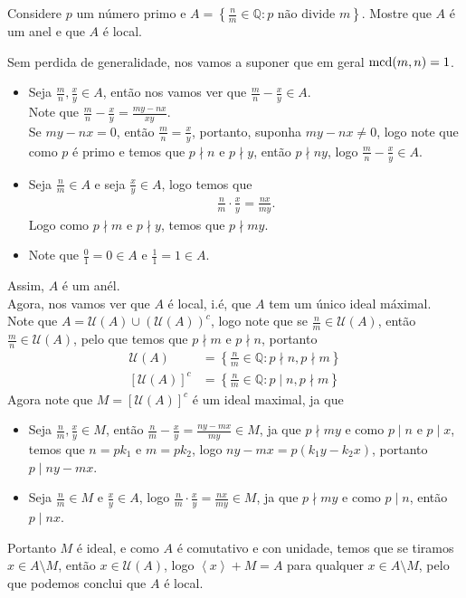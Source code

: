 \begin{homeworkProblem}[2]
  Considere $p$ um número primo e $A=\left\{\frac{n}{m}\in\mathbb{Q}:p\text{ não divide }m\right\}$. Mostre que $A$ é um anel e que $A$ é local. 
  \begin{solution}
    Sem perdida de generalidade, nos vamos a suponer que em geral $\operatorname{mcd}(m,n)=1$.
    \begin{itemize}
      \item Seja $\frac{m}{n},\frac{x}{y}\in A$, então nos vamos ver que $\frac{m}{n}-\frac{x}{y}\in A$.\\
        Note que $\frac{m}{n}-\frac{x}{y}=\frac{my-nx}{xy}$.\\
        Se $my-nx=0$, então $\frac{m}{n}=\frac{x}{y}$, portanto, suponha $my-nx\neq 0$, logo note que como $p$ é primo e temos que $p\nmid n$ e $p\nmid y$, então $p\nmid ny$, logo $\frac{m}{n}-\frac{x}{y}\in A$.
      \item Seja $\frac{n}{m}\in A$ e seja $\frac{x}{y}\in A$, logo temos que
        \begin{align*}
          \frac{n}{m}\cdot\frac{x}{y}=\frac{nx}{my}.
        \end{align*}
        Logo como $p\nmid m$ e $p\nmid y$, temos que $p\nmid my$.
      \item Note que $\frac{0}{1}=0\in A$ e $\frac{1}{1}=1\in A$. 
    \end{itemize}
    Assim, $A$ é um anél.\\

    Agora, nos vamos ver que $A$ é local, i.é, que $A$ tem um único ideal máximal.\\

    Note que $A=\mathcal{U}(A)\cup(\mathcal{U}(A))^{c}$, logo note que se $\frac{n}{m}\in \mathcal{U}(A)$, então $\frac{m}{n}\in\mathcal{U}(A)$, pelo que temos que $p\nmid m$ e $p\nmid n$, portanto
    \begin{align*}
      \mathcal{U}(A)&=\left\{ \frac{n}{m}\in\mathbb{Q}:p\nmid n,p\nmid m \right\}\\
      \left[\mathcal{U}(A)\right]^{c}&=\left\{ \frac{n}{m}\in\mathbb{Q}:p\mid n,p\nmid m \right\}
    \end{align*}
    Agora note que $M=\left[ \mathcal{U}(A) \right]^{c}$ é um ideal maximal, ja que
    \begin{itemize}
      \item Seja $\frac{n}{m},\frac{x}{y}\in M$, então $\frac{n}{m}-\frac{x}{y}=\frac{ny-mx}{my}\in M$, ja que $p\nmid my$ e como $p\mid n$ e $p\mid x$, temos que $n=pk_1$ e $m=pk_2$, logo $ny-mx=p(k_1y-k_2x)$, portanto $p\mid ny-mx$.
      \item Seja $\frac{n}{m}\in M$ e $\frac{x}{y}\in A$, logo $\frac{n}{m}\cdot\frac{x}{y}=\frac{nx}{my}\in M$, ja que $p\nmid my$ e como $p\mid n$, então $p\mid nx$. 
    \end{itemize}
    Portanto $M$ é ideal, e como $A$ é comutativo e con unidade, temos que se tiramos $x\in A\setminus M$, então $x\in\mathcal{U}(A)$, logo $\left\langle x \right\rangle+M=A$ para qualquer $x\in A\setminus M$, pelo que podemos conclui que $A$ é local. 
  \end{solution}
\end{homeworkProblem}
